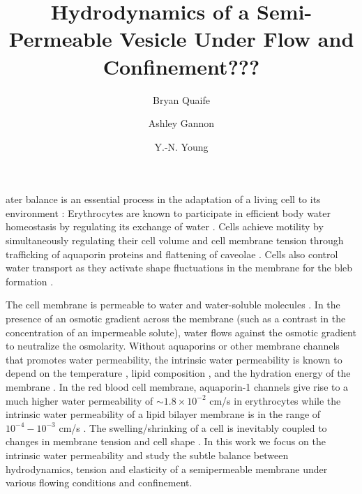 \documentclass[9pt,twocolumn,twoside,lineno]{pnas-new}
\title{Hydrodynamics of a Semi-Permeable Vesicle Under Flow and
Confinement???}
\author[a]{Bryan Quaife}
\author[a]{Ashley Gannon}
\author[b,1]{Y.-N. Young}
\affil[a]{Department of Scientific Computing, Florida State University}
\affil[b]{Department of Mathematical Sciences, New Jeresy Institute of
Technology}
\begin{document}
\maketitle
\thispagestyle{firststyle}


ater balance is an essential process in the adaptation of a living cell to its environment \cite{AlbertsMolecularBiology}: Erythrocytes are known to  participate in efficient body water homeostasis by regulating its exchange of water  \cite{YangMaVerkman2001_JBC,SugieIntaglietta2018_AmJPhysiolHCP}.  Cells achieve motility by simultaneously regulating their cell volume and cell membrane tension through trafficking of aquaporin proteins \cite{SaadounPapadopoulosWatanabeEtAl2005_JCS,Verkman2008_JMM,BerthaudEtAl2016_SM} and flattening of caveolae \cite{Keren2011_EurBJ}. 
Cells also control water transport  as they activate shape fluctuations in the membrane for the bleb formation \cite{TaloniKardashSalmanEtAl2015_PRL}.

The cell membrane is permeable to water and water-soluble molecules \cite{Dick1964_JTB,FettiplaceHaydon1980_PhysRev,DeamerBramhall1986_ChemPhysLipids,Grafmueller2019_ABLS}. In the presence of an osmotic gradient across the membrane (such as a contrast in the concentration of an impermeable solute), water flows against the osmotic gradient  to neutralize the osmolarity. Without aquaporins or other membrane channels that promotes water permeability, the intrinsic water permeability is known to depend on the temperature \cite{OlbrichRawiczNeedhamEtAl2000_BJ}, lipid composition \cite{OlbrichRawiczNeedhamEtAl2000_BJ}, and the hydration  energy of the membrane \cite{MarrinkBerendsen1994_JPhysChem}. In the red blood cell membrane, aquaporin-1 channels give rise to a much higher water permeability of $\sim 1.8\times 10^{-2}$ cm/s in erythrocytes \cite{YangMaVerkman2001_JBC} while the intrinsic water permeability of a lipid bilayer membrane is in the range of $10^{-4}-10^{-3}$ cm/s \cite{ThompsonHuang1966_ANYAS,FettiplaceHaydon1980_PhysRev,Grafmueller2019_ABLS,Dimova2020_GVB,BhatiaRobinsonDimova2020_SoftMatt}. 
%
The swelling/shrinking of a cell is inevitably coupled to changes in membrane tension and cell shape \cite{StrokaJiangChenEtAl2014_Cell,LiMoriSun2015_PRL,yao-mor2017}.  
In this work we focus on the intrinsic water permeability and study the subtle balance between hydrodynamics, tension and elasticity of a semipermeable membrane under various flowing conditions and confinement. 
\end{document}
